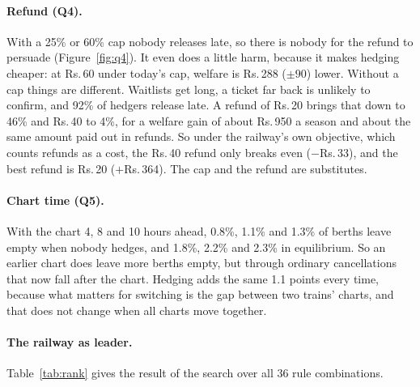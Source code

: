 \documentclass{article}
\newcommand{\rs}{Rs.\,}
\theoremstyle{definition}
\begin{document}
\paragraph{Refund (Q4).} With a 25\% or 60\% cap nobody releases late, so there is nobody for
the refund to persuade (Figure~\ref{fig:q4}). It even does a little harm, because it makes
hedging cheaper: at \rs60 under today's cap, welfare is \rs288 ($\pm90$) lower. Without a cap things are
different. Waitlists get long, a ticket far back is unlikely to confirm, and 92\% of
hedgers release late. A refund of \rs20 brings that down to 46\% and \rs40 to 4\%, for a
welfare gain of about \rs950 a season and about the same amount paid out in refunds. So
under the railway's own objective, which counts refunds as a cost, the \rs40 refund only
breaks even ($-$\rs33), and the best refund is \rs20 ($+$\rs364). The cap and the refund
are substitutes.

\paragraph{Chart time (Q5).} With the chart 4, 8 and 10 hours ahead, 0.8\%, 1.1\% and
1.3\% of berths leave empty when nobody hedges, and 1.8\%, 2.2\% and 2.3\% in equilibrium.
So an earlier chart does leave more berths empty, but through ordinary cancellations that
now fall after the chart. Hedging adds the same 1.1 points every time, because what matters
for switching is the gap between two trains' charts, and that does not change when all
charts move together.

\paragraph{The railway as leader.} Table~\ref{tab:rank} gives the result of the search
over all 36 rule combinations.
\end{document}
